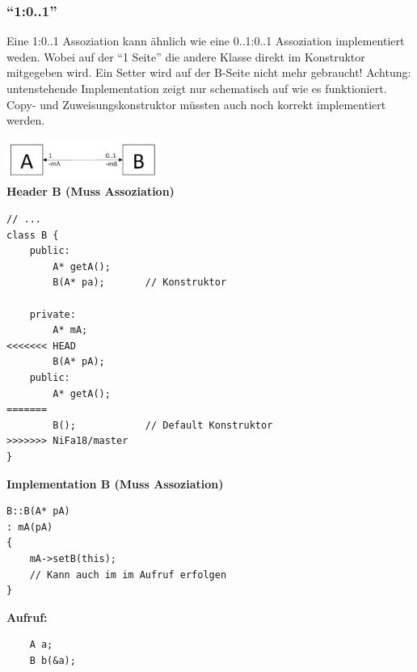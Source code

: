 \subsubsection{"`1:0..1"'}
Eine 1:0..1 Assoziation kann ähnlich wie eine 0..1:0..1 Assoziation
implementiert weden. Wobei auf der "`1 Seite"' die andere Klasse direkt im
Konstruktor mitgegeben wird. Ein Setter wird auf der B-Seite nicht mehr
gebraucht! Achtung: untenstehende Implementation zeigt nur schematisch auf wie
es funktioniert. Copy- und Zuweisungskonstruktor müssten auch noch korrekt
implementiert werden.
\begin{multicols}{2}
\includegraphics[width=5cm]{./bilder/Assozi_1_01.png}\\
\textbf{Header B (Muss Assoziation)}
\begin{lstlisting}
// ...
class B {
	public: 
		A* getA();
		B(A* pa);		// Konstruktor
	
	private:
		A* mA;
<<<<<<< HEAD
		B(A* pA);
	public: 
		A* getA();		
=======
		B();			// Default Konstruktor
>>>>>>> NiFa18/master
}
\end{lstlisting}
\columnbreak
\textbf{Implementation B (Muss Assoziation)}
\begin{lstlisting}
B::B(A* pA)
: mA(pA)
{
	mA->setB(this); 
	// Kann auch im im Aufruf erfolgen
}
\end{lstlisting}

\textbf{Aufruf:}
\begin{lstlisting}
	A a;
	B b(&a);
\end{lstlisting}
\end{multicols}

\newpage

